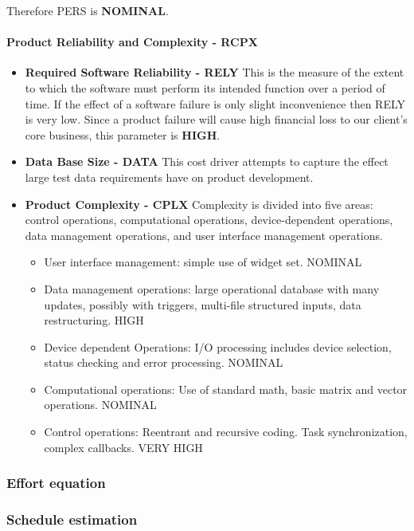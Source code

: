 Therefore PERS is \textbf{NOMINAL}.

\paragraph{Product Reliability and Complexity - RCPX}
\begin{itemize}
	\item \textbf{Required Software Reliability - RELY} This is the measure of the extent to which the software must perform its intended function over a period of time. If the effect of a software failure is only slight inconvenience then RELY is very low. Since a product failure will cause high financial loss to our client's core business, this parameter is \textbf{HIGH}.
	\item \textbf{Data Base Size - DATA} This cost driver attempts to capture the effect large test data requirements have on product development. 
	\item \textbf{Product Complexity - CPLX} Complexity is divided into five areas: control operations, computational operations, device-dependent operations, data management operations, and user interface management operations.
	\begin{itemize}
		\item User interface management: simple use of widget set. NOMINAL
		\item Data management operations: large operational database with many updates, possibly with triggers, multi-file structured inputs, data restructuring. HIGH
		\item Device dependent Operations: I/O processing includes device selection, status checking and error processing. NOMINAL
		\item Computational operations: Use of standard math, basic matrix and vector operations. NOMINAL
		\item Control operations: Reentrant and recursive coding. Task synchronization, complex callbacks. VERY HIGH
	\end{itemize}
\end{itemize}

\subsubsection{Effort equation}

\subsubsection{Schedule estimation }